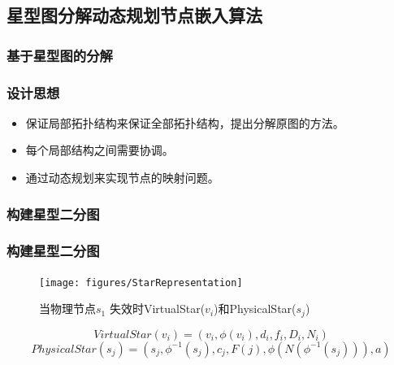 \subsection{星型图分解动态规划节点嵌入算法}
\subsubsection{基于星型图的分解}
\begin{frame}
\frametitle{设计思想}
\begin{itemize}
  \item 保证局部拓扑结构来保证全部拓扑结构，提出分解原图的方法。
  \item 每个局部结构之间需要协调。
  \item 通过动态规划来实现节点的映射问题。
\end{itemize}

\end{frame}


\subsubsection{构建星型二分图}
\begin{frame}
\frametitle{构建星型二分图}
  \begin{figure}
\centering
\texttt{[image: figures/StarRepresentation]}\\
  \caption{当物理节点$s_1$ 失效时VirtualStar($v_i$)和PhysicalStar($s_j$)}\label{fig:StarRepresentation}
\end{figure}
\begin{equation}
VirtualStar(v_i)=(v_i, \phi(v_i), d_i, f_i, D_i, N_i)
\label{eq:virtualstar}
\end{equation}
\begin{equation}
PhysicalStar(s_j)=(s_j, \phi^{-1}( s_j), c_j, F(j), \phi(N(\phi^{-1}( s_j))), a)
\label{eq:physicalstar}
\end{equation}
\end{frame}

